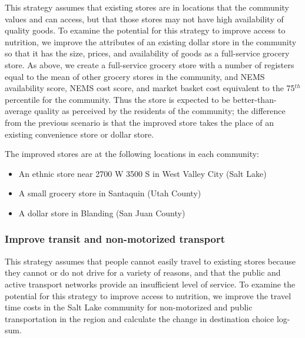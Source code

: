 \documentclass[
  letterpaper,
  number,
  review,
  3p]{elsarticle}
\providecommand{\tightlist}{%
  \setlength{\itemsep}{0pt}\setlength{\parskip}{0pt}}\usepackage{longtable,booktabs,array}
\begin{document}
This strategy assumes that existing stores are in locations that the
community values and can access, but that those stores may not have high
availability of quality goods. To examine the potential for this
strategy to improve access to nutrition, we improve the attributes of an
existing dollar store in the community so that it has the size, prices,
and availability of goods as a full-service grocery store. As above, we
create a full-service grocery store with a number of registers equal to
the mean of other grocery stores in the community, and NEMS availability
score, NEMS cost score, and market basket cost equivalent to the
75\(^{th}\) percentile for the community. Thus the store is expected to
be better-than-average quality as perceived by the residents of the
community; the difference from the previous scenario is that the
improved store takes the place of an existing convenience store or
dollar store.

The improved stores are at the following locations in each community:

\begin{itemize}
\tightlist
\item
  An ethnic store near 2700 W 3500 S in West Valley City (Salt Lake)
\item
  A small grocery store in Santaquin (Utah County)
\item
  A dollar store in Blanding (San Juan County)
\end{itemize}

\subsubsection{Improve transit and non-motorized
transport}\label{improve-transit-and-non-motorized-transport}

This strategy assumes that people cannot easily travel to existing
stores because they cannot or do not drive for a variety of reasons, and
that the public and active transport networks provide an insufficient
level of service. To examine the potential for this strategy to improve
access to nutrition, we improve the travel time costs in the Salt Lake
community for non-motorized and public transportation in the region and
calculate the change in destination choice log-sum.
\end{document}
